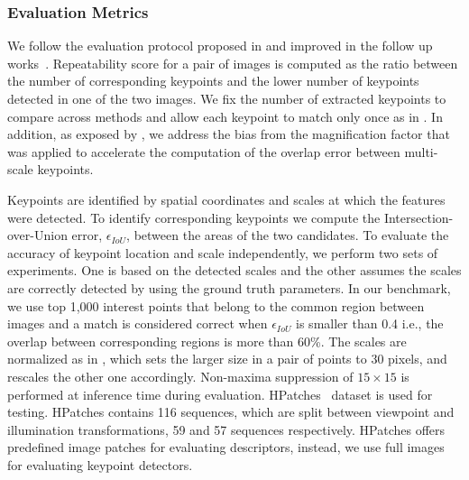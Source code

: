 
\subsubsection{Evaluation Metrics}
\label{subsec:Evaluation}

We follow the evaluation protocol proposed in \cite{mikolajczykpami2005} and improved in the follow up works~\cite{LIFT,Karel_Vedaldi_ECCV_16,Zhang_Felix_CVPR_17,Karel_Vedaldi_BMVC_18}. Repeatability score for a pair of images is computed as the ratio between the number of corresponding keypoints and the lower number of keypoints detected in one of the two images. We fix the number of extracted keypoints to compare across methods and allow each keypoint to match only once as in \cite{FASTER, TILDE}. In addition, as exposed by \cite{Karel_Vedaldi_BMVC_18}, we address the bias from the magnification factor that was applied to accelerate the computation of the overlap error between multi-scale keypoints.

Keypoints are identified by spatial coordinates and scales at which the features were detected.  To identify corresponding keypoints we compute the Intersection-over-Union error, $\epsilon_{IoU}$, between the areas of the two candidates. To evaluate the accuracy of keypoint location and scale independently, we perform two sets of experiments. One is based on the detected scales and the other assumes the scales are correctly detected by using the ground truth parameters. In our benchmark, we use top 1,000 interest points that belong to the common region between images and a match is considered correct when $\epsilon_{IoU}$ is smaller than 0.4 i.e., the overlap between corresponding regions is more than 60\%. The scales are normalized as in \cite{Karel_Vedaldi_BMVC_18}, which sets the larger size in a pair of points to 30 pixels, and rescales the other one accordingly. Non-maxima suppression of $15 \times 15$ is performed at inference time during evaluation. HPatches~\cite{HPatches} dataset is used for testing. HPatches contains 116 sequences, which are split between viewpoint and illumination transformations, 59 and 57 sequences respectively. HPatches offers predefined image patches for evaluating descriptors, instead, we use full images for evaluating keypoint detectors. 


